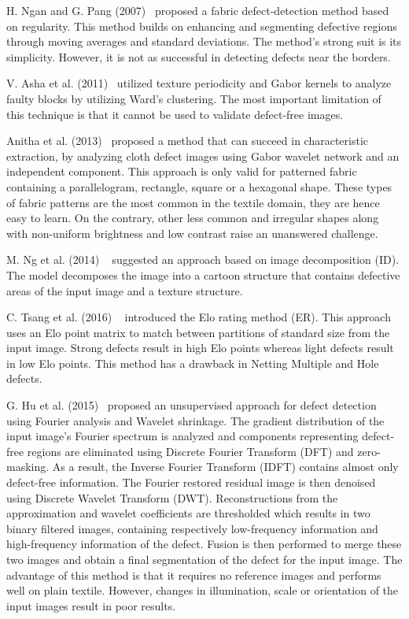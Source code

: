 \documentclass[3p,,preprint,review,12pt]{elsarticle}
\begin{document}
H. Ngan and G. Pang (2007)\unskip~\cite{981091:21201213} proposed a fabric defect-detection method based on regularity. This method builds on enhancing and segmenting defective regions through moving averages and standard deviations. The method's strong suit is its simplicity. However, it is not as successful in detecting defects near the borders.

V. Asha et al. (2011)\unskip~\cite{981091:21201199} utilized texture periodicity and Gabor kernels to analyze faulty blocks by utilizing Ward's clustering. The most important limitation of this technique is that it cannot be used to validate defect-free images.

Anitha et al. (2013)\unskip~\cite{981091:21201202} proposed a method that can succeed in characteristic extraction, by analyzing cloth defect images using Gabor wavelet network and an independent component. This approach is only valid for patterned fabric containing a parallelogram, rectangle, square or a hexagonal shape. These types of fabric patterns are the most common in the textile domain, they are hence easy to learn. On the contrary, other less common and irregular shapes along with non-uniform brightness and low contrast raise an unanswered challenge.

M. Ng et al. (2014) \unskip~\cite{981091:21201214} suggested an approach based on image decomposition (ID). The model decomposes the image into a cartoon structure that contains defective areas of the input image and a texture structure. 

C. Tsang et al. (2016) \unskip~\cite{981091:21201215} introduced the Elo rating method (ER). This approach uses an Elo point matrix to match between partitions of standard size from the input image. Strong defects result in high Elo points whereas light defects result in low Elo points. This method has a drawback in Netting Multiple and Hole defects.


G. Hu et al. (2015)\unskip~\cite{981091:21201189} proposed an unsupervised approach for defect detection using Fourier analysis and Wavelet shrinkage. The gradient distribution of the input image's Fourier spectrum is analyzed and components representing defect-free regions are eliminated using Discrete Fourier Transform (DFT) and zero-masking. As a result, the Inverse Fourier Transform (IDFT) contains almost only defect-free information. The Fourier restored residual image is then denoised using Discrete Wavelet Transform (DWT). Reconstructions from the approximation and wavelet coefficients are thresholded which results in two binary filtered images, containing respectively low-frequency information and high-frequency information of the defect. Fusion is then performed to merge these two images and obtain a final segmentation of the defect for the input image. The advantage of this method is that it requires no reference images and performs well on plain textile. However, changes in illumination, scale or orientation of the input images result in poor results. 
\end{document}
